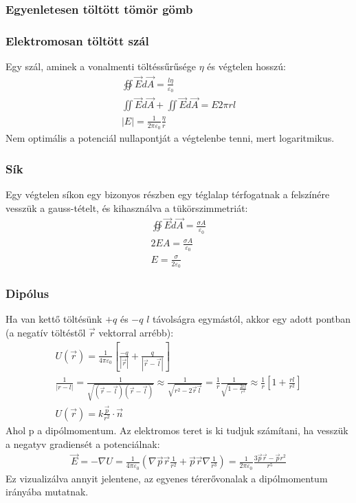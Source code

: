 \documentclass{article}
\begin{document}
\subsubsection{Egyenletesen töltött tömör gömb}
\subsubsection{Elektromosan töltött szál}
Egy szál, aminek a vonalmenti töltéssűrűsége $\eta$ és végtelen hosszú:
\begin{gather*}
\oiint \vec{E} d\vec{A} = \frac{l\eta}{\varepsilon_0}\\
\iint \vec{E} d\vec{A} + \iint \vec{E} d\vec{A} = E 2 \pi r l \\
|E| = \frac{1}{2\pi\varepsilon_0} \frac{\eta}{r}
\end{gather*}
Nem optimális a potenciál nullapontját a végtelenbe tenni, mert logaritmikus.
\subsubsection{Sík}
Egy végtelen síkon egy bizonyos részben egy téglalap térfogatnak a felszínére vesszük a gauss-tételt, és kihasználva a tükörszimmetriát:
\begin{gather*}
\oiint \vec{E} d\vec{A} = \frac{\sigma A}{\varepsilon_0} \\
2EA=\frac{\sigma A}{\varepsilon_0} \\
E=\frac{\sigma}{2\varepsilon_0}
\end{gather*}
\subsubsection{Dipólus}
Ha van kettő töltésünk $+q$ és $-q$ $l$ távolságra egymástól, akkor egy adott pontban (a negatív töltéstől $\vec{r}$ vektorral arrébb):
\begin{gather*}
U(\vec{r})=\frac{1}{4\pi\varepsilon_0}\left[ \frac{-q}{|\vec{r}|} + \frac{q}{|\vec{r}-\vec{l}|}\right] \\
\frac{1}{|r-l|}=\frac{1}{\sqrt{(\vec{r}-\vec{l})(\vec{r}-\vec{l})}}\approx\frac{1}{\sqrt{r^2-2\vec{r}\vec{l}}} = \frac{1}{r}\frac{1}{\sqrt{1-\frac{2rl}{r^2}}} \approx \frac{1}{r} \left[ 1+\frac{rl}{r^2} \right] \\
U(\vec{r})=k\frac{\vec{p}}{r^2}\cdot \vec{n}
\end{gather*}
Ahol p a dipólmomentum. Az elektromos teret is ki tudjuk számítani, ha vesszük a negatyv gradiensét a potenciálnak: 
\begin{gather*}
\vec{E}=-\nabla U = \frac{1}{4\pi \varepsilon_0}(\nabla \vec{p}\vec{r} \frac{1}{r^2}+\vec{p}\vec{r}\nabla \frac{1}{r^3}) = \frac{1}{2\pi \varepsilon_0} \frac{3\vec{p}\vec{r}-\vec{p}r^2}{r^5}
\end{gather*}
Ez vizualizálva annyit jelentene, az egyenes térerővonalak a dipólmomentum irányába mutatnak.
\end{document}
